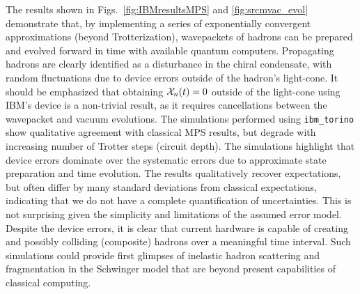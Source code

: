 \documentclass[aps, prc, tightenlines,superscriptaddress, letterpaper, amsmath, amssymb, preprintnumbers, floatfix, longbibliography, nofootinbib]{revtex4-2}
\begin{document}
The results shown in Figs.~\ref{fig:IBMresultsMPS} and \ref{fig:srcmvac_evol} demonstrate that, by implementing a series of exponentially convergent approximations (beyond Trotterization), wavepackets of hadrons can be prepared and evolved forward in time with available quantum computers.
Propagating hadrons are clearly identified as a disturbance in the chiral condensate, with random fluctuations due to device errors outside of the hadron's light-cone.
It should be emphasized that obtaining ${\cal X}_n(t) = 0$ outside of the light-cone using IBM's device is a non-trivial result, as it requires cancellations between the wavepacket and vacuum evolutions.
The simulations performed using {\tt ibm\_torino} show qualitative agreement with classical MPS results, but degrade with increasing number of Trotter steps (circuit depth).
The simulations highlight that device errors dominate over the systematic errors due to approximate state preparation and time evolution.
The results qualitatively recover expectations, but often differ by many standard deviations from classical expectations, indicating that we do not have a complete quantification of uncertainties.
This is not surprising given the simplicity and limitations of the assumed error model.
Despite the device errors, it is clear that current hardware is capable of creating and possibly colliding (composite) hadrons over a meaningful time interval.
Such simulations could provide first glimpses of inelastic hadron scattering and fragmentation in the Schwinger model that are beyond present capabilities of classical computing.




\end{document}
